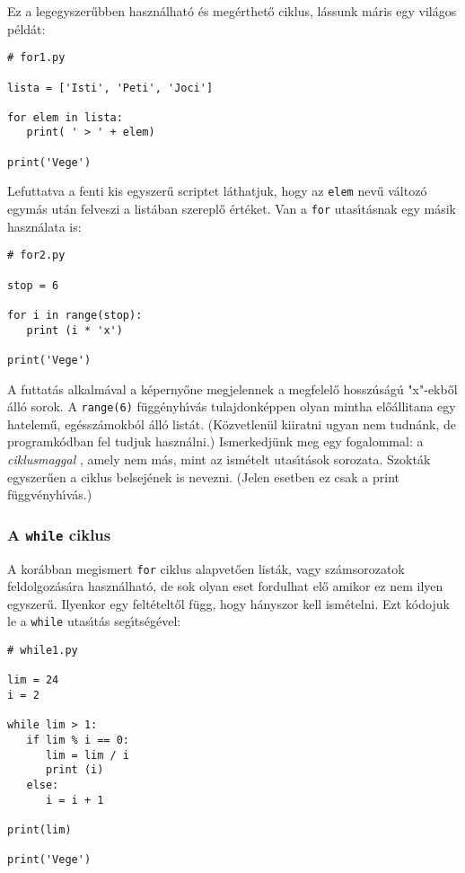 \documentclass[12pt]{article}
\begin{document}
Ez a legegyszer\H{u}bben haszn\'alhat\'{o} \'es meg\'erthet\H{o} ciklus, l\'assunk m\'aris egy vil\'agos p\'eld\'at:

\begin{Verbatim}[fontsize=\small]
# for1.py

lista = ['Isti', 'Peti', 'Joci'] 

for elem in lista:
   print( ' > ' + elem)

print('Vege')
\end{Verbatim}

Lefuttatva a fenti kis egyszer\H{u} scriptet l\'athatjuk, hogy az {\tt elem} nev\H{u} v\'altoz\'o egym\'as ut\'an 
felveszi a list\'aban szerepl\H{o} \'ert\'eket. Van a {\tt for} utas\'{\i}t\'asnak egy m\'asik haszn\'alata is: 

\begin{Verbatim}[fontsize=\small]
# for2.py

stop = 6

for i in range(stop):
   print (i * 'x')

print('Vege')
\end{Verbatim}

A futtat\'as alkalm\'aval a k\'eperny\H{o}ne megjelennek a megfelel\H{o} hossz\'us\'ag\'u "x"-ekb\H{o}l \'all\'o 
sorok. A {\tt range(6)} f\"ugg\'enyh\'{\i}v\'as tulajdonk\'eppen olyan mintha el\H{o}\'allitana egy hatelem\H{u}, 
eg\'essz\'amokb\'ol \'all\'o list\'at. (K\"ozvetlen\"ul kiiratni ugyan nem tudn\'ank, de programk\'odban fel 
tudjuk haszn\'alni.) Ismerkedj\"unk meg egy fogalommal: a {\sl ciklusmaggal} , amely nem m\'as, mint az 
ism\'etelt 
utas\'{\i}t\'asok sorozata. Szokt\'ak egyszer\H{u}en a ciklus belsej\'enek is nevezni. (Jelen esetben ez csak a 
print f\"uggv\'enyh\'{\i}v\'as.)

\subsubsection{A {\tt while} ciklus}

A kor\'abban megismert {\tt for} ciklus alapvet\H{o}en list\'ak, vagy sz\'amsorozatok  feldolgoz\'as\'ara haszn\'alhat\'o, 
de sok olyan eset fordulhat el\H{o} amikor ez nem ilyen egyszer\H{u}. Ilyenkor egy felt\'etelt\H{o}l f\"ugg, hogy 
h\'anyszor kell ism\'etelni. Ezt k\'odojuk le a {\tt while} utas\'{\i}t\'as seg\'{\i}ts\'eg\'evel:

\begin{Verbatim}[fontsize=\small]
# while1.py

lim = 24
i = 2

while lim > 1:
   if lim % i == 0:
      lim = lim / i
      print (i)
   else:
      i = i + 1

print(lim)

print('Vege')
\end{Verbatim}
\end{document}
